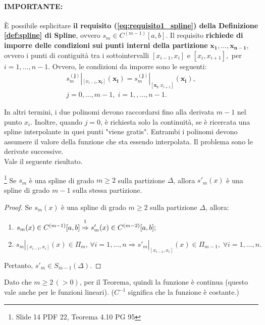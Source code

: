 \paragraph{IMPORTANTE:} È possibile esplicitare \textbf{il requisito (\ref{eq:requisito1_spline}) della Definizione \ref{def:spline} di Spline}, ovvero $s_m \in C^{(m-1)}[a,b]$. Il requisito \textbf{richiede di imporre delle condizioni sui punti interni della partizione} $\boldsymbol{x_1,\hdots,x_{n-1}}$, ovvero i punti di contiguità tra i sottointervalli $[x_{i-1},x_i]$ e $[x_i,x_{i+1}],$ per $ i=1,\hdots,n-1$. Ovvero, le condizioni da imporre sono le seguenti:
\begin{equation}\label{eq:condizioni_continuita_spline}
    \begin{matrix}
        s_m^{(\boldsymbol{j})}|_{[x_{i-1},\boldsymbol{x_i}]}(\boldsymbol{x_i})= s_m^{(\boldsymbol{j})}|_{[\boldsymbol{x_i},x_{i+1}]}(\boldsymbol{x_i}),\\
        j=0,\hdots,m-1,\; i=1,,\hdots,n-1.
    \end{matrix}
\end{equation}

\noindent In altri termini, i due polinomi devono raccordarsi fino alla derivata $m-1$ nel punto $x_i$. Inoltre, quando $j=0$, è richiesta solo la continuità, se è ricercata una spline interpolante in quei punti "viene gratis". Entrambi i polinomi devono assumere il valore della funzione che sta essendo interpolata. Il problema sono le derivate successive.\\

\noindent Vale il seguente risultato.

\begin{theorem}\label{th:grado_derivata_spline}
    \footnote{Slide 14 PDF 22, Teorema 4.10 PG 95} Se $s_m$ è una spline di grado $m\geq 2$ sulla partizione $\Delta$, allora $s'_m(x)$ è una spline di grado $m-1$ sulla stessa partizione.
\end{theorem}
\begin{proof}
    Se $s_m(x)$ è una spline di grado $m\geq 2$ sulla partizione $\Delta$, allora:
    \begin{enumerate}
        \item $s_m(x)\in C^{(m-1)}[a,b]\overset{\footnotemark}{\Rightarrow} s'_m(x)\in C^{(m-2)}[a,b];$
        \item $s_m|_{[x_{i-1},x_i]}(x)\in\Pi_m,\,\forall i=1,\hdots,n\Rightarrow s'_m|_{[x_{i-1},x_i]}(x)\in\Pi_{m-1},\;\forall i=1,\hdots,n.$
    \end{enumerate}
    Pertanto, $s'_m\in S_{m-1}(\Delta).$
\end{proof}
Dato che $m\geq 2\,(>0)$, per il Teorema, quindi la funzione è continua (questo vale anche per le funzioni lineari). ($C^{-1}$ significa che la funzione è costante.)

